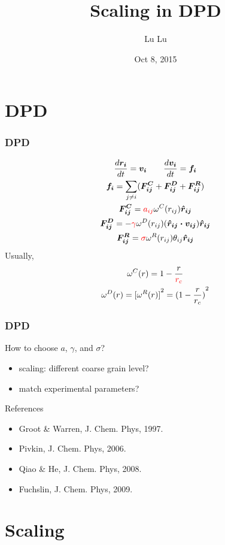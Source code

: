 \documentclass{beamer}
\title{Scaling in DPD}
\author{Lu Lu}
\institute{DPD Club Meeting}
\date{Oct 8, 2015}
\begin{document}
\frame{\titlepage}

\section{DPD}

\begin{frame}
\frametitle{DPD}
\begin{gather}
    \frac{d \boldsymbol{r_i}}{dt} = \boldsymbol{v_i} \qquad \frac{d \boldsymbol{v_i}}{dt} = \boldsymbol{f_i} \\
    \boldsymbol{f_i} = \sum_{j \neq i} (\boldsymbol{F^C_{ij}} + \boldsymbol{F^D_{ij}} + \boldsymbol{F^R_{ij}}) \\
    \boldsymbol{F_{ij}^C} = \textcolor{red}{a_{ij}} \omega^C(r_{ij}) \boldsymbol{\hat{r}_{ij}} \\
    \boldsymbol{F_{ij}^D} = -\textcolor{red}{\gamma} \omega^D(r_{ij}) (\boldsymbol{\hat{r}_{ij} \cdot v_{ij}}) \boldsymbol{\hat{r}_{ij}} \\
    \boldsymbol{F_{ij}^R} = \textcolor{red}{\sigma} \omega^R(r_{ij}) \theta_{ij} \boldsymbol{\hat{r}_{ij}}
\end{gather}
Usually,
\begin{gather}
    \omega^C(r) = 1 - \frac{r}{\textcolor{red}{r_c}} \\
    \omega^D(r) = {[\omega^R(r)]}^2 = {(1 - \frac{r}{r_c})}^2
\end{gather}
\end{frame}

\begin{frame}
\frametitle{DPD}
How to choose $a$, $\gamma$, and $\sigma$?
\begin{itemize}
    \item scaling: different coarse grain level?
    \item match experimental parameters?
\end{itemize}
References
\begin{itemize}
    \item Groot \& Warren, J. Chem. Phys, 1997.
    \item Pivkin, J. Chem. Phys, 2006.
    \item Qiao \& He, J. Chem. Phys, 2008.
    \item Fuchslin, J. Chem. Phys, 2009.
\end{itemize}
\end{frame}

\section{Scaling}
\end{document}

